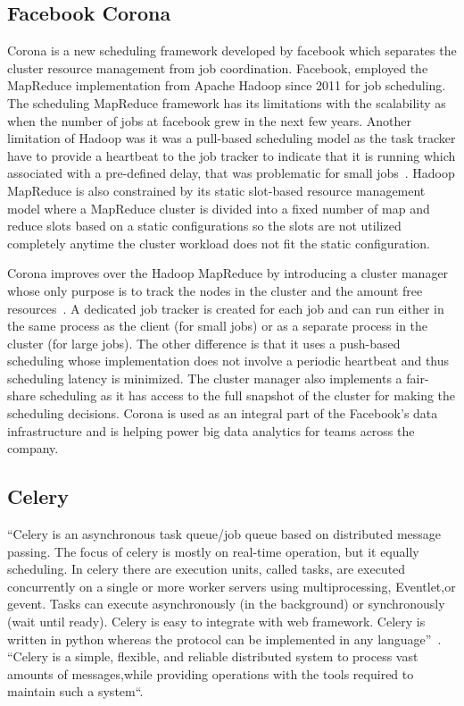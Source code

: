 {\subsection{Facebook Corona}

Corona is a new scheduling framework developed by facebook which
separates the cluster resource management from job coordination.
Facebook, employed the MapReduce implementation from Apache Hadoop
since 2011 for job scheduling. The scheduling MapReduce framework has
its limitations with the scalability as when the number of jobs at
facebook grew in the next few years. Another limitation of Hadoop was
it was a pull-based scheduling model as the task tracker have to
provide a heartbeat to the job tracker to indicate that it is running
which associated with a pre-defined delay, that was problematic for
small jobs~\cite{www-facebook-corona}. Hadoop MapReduce is also
constrained by its static slot-based resource management model where a
MapReduce cluster is divided into a fixed number of map and reduce
slots based on a static configurations so the slots are not utilized
completely anytime the cluster workload does not fit the static
configuration.

Corona improves over the Hadoop MapReduce by introducing a cluster
manager whose only purpose is to track the nodes in the cluster and
the amount free resources~\cite{www-facebook-corona}. A dedicated job
tracker is created for each job and can run either in the same process
as the client (for small jobs) or as a separate process in the cluster
(for large jobs). The other difference is that it uses a push-based
scheduling whose implementation does not involve a periodic heartbeat
and thus scheduling latency is minimized. The cluster manager also
implements a fair-share scheduling as it has access to the full
snapshot of the cluster for making the scheduling decisions. Corona is
used as an integral part of the Facebook's data infrastructure and is
helping power big data analytics for teams across the company.
     
\subsection{Celery}

``Celery is an asynchronous task queue/job queue based on distributed
message passing.  The focus of celery is mostly on real-time
operation, but it equally scheduling.  In celery there are execution
units, called tasks, are executed concurrently on a single or more
worker servers using multiprocessing, Eventlet,or gevent.  Tasks can
execute asynchronously (in the background) or synchronously (wait
until ready).  Celery is easy to integrate with web framework. Celery
is written in python whereas the protocol can be implemented in any
language''~\cite{celery}. ``Celery is a simple, flexible, and reliable
distributed system to process vast amounts of messages,while providing
operations with the tools required to maintain such a
system``\cite{celerydocs}.

}
